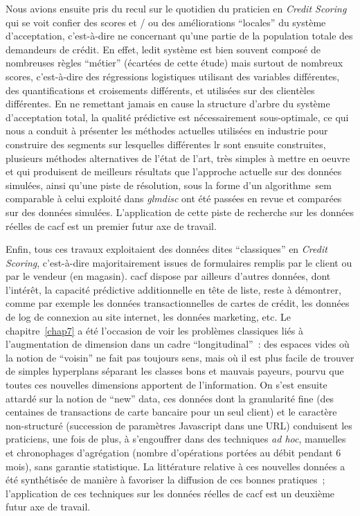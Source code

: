 Nous avions ensuite pris du recul sur le quotidien du praticien en \textit{Credit Scoring} qui se voit confier des scores et / ou des améliorations ``locales'' du système d'acceptation, c'est-à-dire ne concernant qu'une partie de la population totale des demandeurs de crédit. En effet, ledit système est bien souvent composé de nombreuses règles ``métier'' (écartées de cette étude) mais surtout de nombreux scores, c'est-à-dire des régressions logistiques utilisant des variables différentes, des quantifications et croisements différents, et utilisées sur des clientèles différentes. En ne remettant jamais en cause la structure d'arbre du système d'acceptation total, la qualité prédictive est nécessairement sous-optimale, ce qui nous a conduit à présenter les méthodes actuelles utilisées en industrie pour construire des segments sur lesquelles différentes \gls{lr} sont ensuite construites, plusieurs méthodes alternatives de l'état de l'art, très simples à mettre en oeuvre et qui produisent de meilleurs résultats que l'approche actuelle sur des données simulées, ainsi qu'une piste de résolution, sous la forme d'un algorithme~\gls{sem} comparable à celui exploité dans \textit{glmdisc} ont été passées en revue et comparées sur des données simulées. L'application de cette piste de recherche sur les données réelles de \gls{cacf} est un premier futur axe de travail.

\medskip

Enfin, tous ces travaux exploitaient des données dites ``classiques'' en \textit{Credit Scoring}, c'est-à-dire majoritairement issues de formulaires remplis par le client ou par le vendeur (en magasin). \gls{cacf} dispose par ailleurs d'autres données, dont l'intérêt, la capacité prédictive additionnelle en tête de liste, reste à démontrer, comme par exemple les données transactionnelles de cartes de crédit, les données de log de connexion au site internet, les données marketing, etc. Le chapitre~\ref{chap7} a été l'occasion de voir les problèmes classiques liés à l'augmentation de dimension dans un cadre ``longitudinal''~: des espaces vides où la notion de ``voisin'' ne fait pas toujours sens, mais où il est plus facile de trouver de simples hyperplans séparant les classes bons et mauvais payeurs, pourvu que toutes ces nouvelles dimensions apportent de l'information. On s'est ensuite attardé sur la notion de ``new'' data, ces données dont la granularité fine (des centaines de transactions de carte bancaire pour un seul client) et le caractère non-structuré (succession de paramètres Javascript dans une URL) conduisent les praticiens, une fois de plus, à s'engouffrer dans des techniques \textit{ad hoc}, manuelles et chronophages d'agrégation (nombre d'opérations portées au débit pendant 6 mois), sans garantie statistique. La littérature relative à ces nouvelles données a été synthétisée de manière à favoriser la diffusion de ces bonnes pratiques~; l'application de ces techniques sur les données réelles de \gls{cacf} est un deuxième futur axe de travail.

